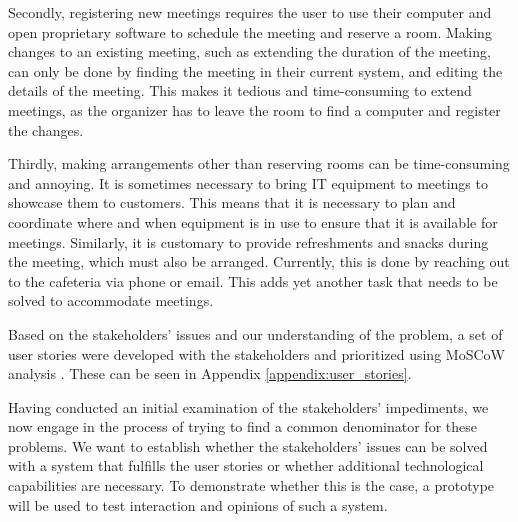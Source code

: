 Secondly, registering new meetings requires the user to use their computer and open proprietary software to schedule the meeting and reserve a room.
Making changes to an existing meeting, such as extending the duration of the meeting, can only be done by finding the meeting in their current system, and editing the details of the meeting.
This makes it tedious and time-consuming to extend meetings, as the organizer has to leave the room to find a computer and register the changes.

Thirdly, making arrangements other than reserving rooms can be time-consuming and annoying. 
It is sometimes necessary to bring IT equipment to meetings to showcase them to customers.
This means that it is necessary to plan and coordinate where and when equipment is in use to ensure that it is available for meetings. 
Similarly, it is customary to provide refreshments and snacks during the meeting, which must also be arranged. 
Currently, this is done by reaching out to the cafeteria via phone or email.
This adds yet another task that needs to be solved to accommodate meetings.

Based on the stakeholders' issues and our understanding of the problem, a set of user stories were developed with the stakeholders and prioritized using MoSCoW analysis \cite{DEBbook}.
These can be seen in Appendix \ref{appendix:user_stories}.

Having conducted an initial examination of the stakeholders' impediments, we now engage in the process of trying to find a common denominator for these problems.
We want to establish whether the stakeholders' issues can be solved with a system that fulfills the user stories or whether additional technological capabilities are necessary. 
To demonstrate whether this is the case, a prototype will be used to test interaction and opinions of such a system.